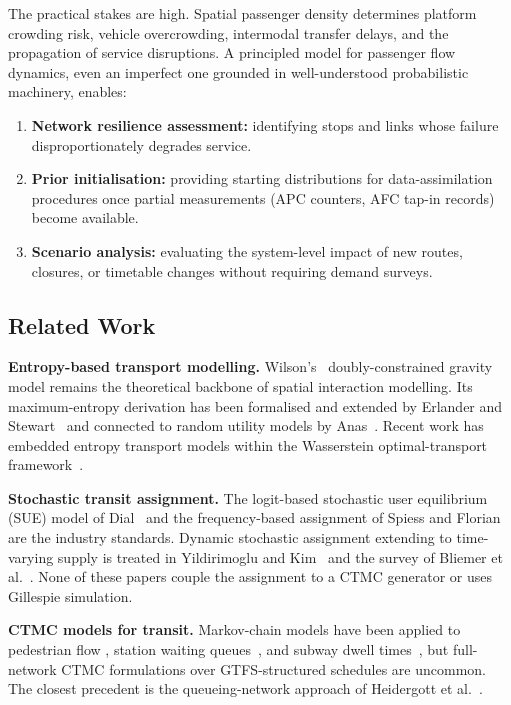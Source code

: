 \documentclass[12pt,a4paper]{article}
\theoremstyle{plain}
\theoremstyle{definition}
\theoremstyle{remark}
\begin{document}
The practical stakes are high.  Spatial passenger density determines platform
crowding risk, vehicle overcrowding, intermodal transfer delays, and the
propagation of service disruptions.  A principled model for passenger flow
dynamics, even an imperfect one grounded in well-understood probabilistic
machinery, enables:
\begin{enumerate}
  \item \textbf{Network resilience assessment:} identifying stops and links
    whose failure disproportionately degrades service.
  \item \textbf{Prior initialisation:} providing starting distributions for
    data-assimilation procedures once partial measurements (APC counters, AFC
    tap-in records) become available.
  \item \textbf{Scenario analysis:} evaluating the system-level impact of new
    routes, closures, or timetable changes without requiring demand surveys.
\end{enumerate}

\subsection{Related Work}

\textbf{Entropy-based transport modelling.}
Wilson's~\citep{wilson1969} doubly-constrained gravity model remains the
theoretical backbone of spatial interaction modelling.  Its maximum-entropy
derivation has been formalised and extended by Erlander and
Stewart~\citep{erlander1990} and connected to random utility models by
Anas~\citep{anas1983}.  Recent work has embedded entropy transport models within
the Wasserstein optimal-transport framework~\citep{peyre2019}.

\textbf{Stochastic transit assignment.}
The logit-based stochastic user equilibrium (SUE) model of Dial~\citep{dial1971}
and the frequency-based assignment of Spiess and Florian~\citep{spiess1989} are
the industry standards.  Dynamic stochastic assignment extending to
time-varying supply is treated in Yildirimoglu and Kim~\citep{yildirimoglu2018}
and the survey of Bliemer et al.~\citep{bliemer2003}.  None of these papers
couple the assignment to a CTMC generator or uses Gillespie simulation.

\textbf{CTMC models for transit.}
Markov-chain models have been applied to pedestrian flow
\citep{helbing2000},
station waiting queues~\citep{jaiswal1961}, and subway dwell
times~\citep{zhang2019}, but full-network CTMC formulations over
GTFS-structured schedules are uncommon.  The closest precedent is the
queueing-network approach of Heidergott et al.~\citep{heidergott2010}.
\end{document}
